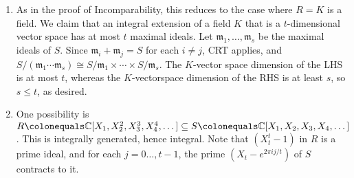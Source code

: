 \documentclass[12pt]{amsart}
\newcommand{\C}{\mathbb{C}}
\newcommand{\m}{\mathfrak{m}}
\renewcommand{\1}{\mathbbm{1}}
\newcommand{\solution}[1]{\ifthenelse {\equal{\displaysol}{1}} {\begin{framed}{\color{meretale}\noindent #1}\end{framed}} { \ }}
\newcommand\ceq{\colonequals}
\begin{document}
\begin{enumerate}
\solution{
\begin{enumerate} 
\item As in the proof of Incomparability, this reduces to the case where $R=K$ is a field. We claim that an integral extension of a field $K$ that is a $t$-dimensional vector space has at most $t$ maximal ideals. Let $\m_1,\dots,\m_s$ be the maximal ideals of $S$. Since $\m_i+\m_j=S$ for each $i\neq j$, CRT applies, and $S/(\m_1\cdots \m_s) \cong S/\m_1 \times \cdots \times S/\m_s$. The $K$-vector space dimension of the LHS is at most $t$, whereas the $K$-vectorspace dimension of the RHS is at least $s$, so $s\leq t$, as desired.
\item One possibility is $R\ceq \C[X_1,X_2^2,X_3^3,X_4^4,\dots] \subseteq S\ceq \C[X_1,X_2,X_3,X_4,\dots]$. This is integrally generated, hence integral. Note that $(X_t^t -1)$ in $R$ is a prime ideal, and for each $j=0\dots,t-1$, the prime $(X_t- e^{2\pi i j /t})$ of $S$ contracts to it.
\end{enumerate}
}

\end{enumerate}
\end{document}
